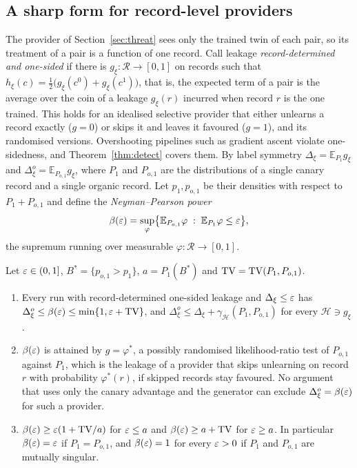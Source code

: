 \subsection{A sharp form for record-level providers}

The provider of Section~\ref{sec:threat} sees only the trained twin of each pair, so its
treatment of a pair is a function of one record. Call leakage \emph{record-determined and
one-sided} if there is $g_\xi:\mathcal R\to[0,1]$ on records such that
$h_\xi(c)=\frac12\bigl(g_\xi(c^0)+g_\xi(c^1)\bigr)$, that is, the expected term of a pair is
the average over the coin of a leakage $g_\xi(r)$ incurred when record $r$ is the one
trained. This holds for an idealised selective provider that either unlearns a record exactly
($g=0$) or skips it and leaves it favoured ($g=1$), and its randomised versions. Overshooting
pipelines such as gradient ascent violate one-sidedness, and Theorem~\ref{thm:detect} covers
them. By label symmetry $\Delta_\xi=\mathbb{E}_{P_1}g_\xi$ and
$\Delta^o_\xi=\mathbb{E}_{P_{o,1}}g_\xi$, where $P_1$ and $P_{o,1}$ are the distributions of
a single canary record and a single organic record. Let $p_1,p_{o,1}$ be their densities with
respect to $P_1+P_{o,1}$ and define the \emph{Neyman--Pearson power}
\[
\beta(\varepsilon)=\sup_{\varphi}\bigl\{\mathbb{E}_{P_{o,1}}\varphi\;:\;\mathbb{E}_{P_1}\varphi\le\varepsilon\bigr\},
\]
the supremum running over measurable $\varphi:\mathcal R\to[0,1]$.

\begin{theorem}\label{thm:sharp}
Let $\varepsilon\in(0,1]$, $B^\ast=\{p_{o,1}>p_1\}$, $a=P_1(B^\ast)$ and $\mathrm{TV}=\mathrm{TV}(P_1,P_{o,1})$.
\begin{enumerate}
\item[(i)] Every run with record-determined one-sided leakage and $\Delta_\xi\le\varepsilon$ has
$\Delta^o_\xi\le\beta(\varepsilon)\le\min\{1,\varepsilon+\mathrm{TV}\}$, and $\Delta^o_\xi\le\Delta_\xi+
\gamma_{\mathcal H}(P_1,P_{o,1})$ for every $\mathcal H\ni g_\xi$.
\item[(ii)] $\beta(\varepsilon)$ is attained by $g=\varphi^\ast$, a possibly randomised
likelihood-ratio test of $P_{o,1}$ against $P_1$, which is the leakage of a provider that
skips unlearning on record $r$ with probability $\varphi^\ast(r)$, if skipped records stay
favoured. No argument that uses only the canary advantage and the generator can exclude
$\Delta^o_\xi=\beta(\varepsilon)$ for such a provider.
\item[(iii)] $\beta(\varepsilon)\ge\varepsilon(1+\mathrm{TV}/a)$ for $\varepsilon\le a$ and $\beta(\varepsilon)\ge a+\mathrm{TV}$ for
$\varepsilon\ge a$. In particular $\beta(\varepsilon)=\varepsilon$ if $P_1=P_{o,1}$, and $\beta(\varepsilon)=1$ for every
$\varepsilon>0$ if $P_1$ and $P_{o,1}$ are mutually singular.
\end{enumerate}
\end{theorem}

